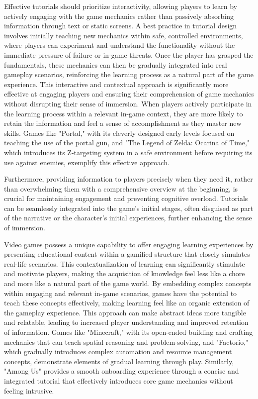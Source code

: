 \documentclass{article}
\begin{document}
    Effective tutorials should prioritize interactivity, allowing players to learn by actively engaging with the game mechanics rather than passively absorbing information through text or static screens. A best practice in tutorial design involves initially teaching new mechanics within safe, controlled environments, where players can experiment and understand the functionality without the immediate pressure of failure or in-game threats. Once the player has grasped the fundamentals, these mechanics can then be gradually integrated into real gameplay scenarios, reinforcing the learning process as a natural part of the game experience. This interactive and contextual approach is significantly more effective at engaging players and ensuring their comprehension of game mechanics without disrupting their sense of immersion. When players actively participate in the learning process within a relevant in-game context, they are more likely to retain the information and feel a sense of accomplishment as they master new skills. Games like "Portal," with its cleverly designed early levels focused on teaching the use of the portal gun, and "The Legend of Zelda: Ocarina of Time," which introduces its Z-targeting system in a safe environment before requiring its use against enemies, exemplify this effective approach.

    Furthermore, providing information to players precisely when they need it, rather than overwhelming them with a comprehensive overview at the beginning, is crucial for maintaining engagement and preventing cognitive overload. Tutorials can be seamlessly integrated into the game's initial stages, often disguised as part of the narrative or the character's initial experiences, further enhancing the sense of immersion.

    Video games possess a unique capability to offer engaging learning experiences by presenting educational content within a gamified structure that closely simulates real-life scenarios. This contextualization of learning can significantly stimulate and motivate players, making the acquisition of knowledge feel less like a chore and more like a natural part of the game world. By embedding complex concepts within engaging and relevant in-game scenarios, games have the potential to teach these concepts effectively, making learning feel like an organic extension of the gameplay experience. This approach can make abstract ideas more tangible and relatable, leading to increased player understanding and improved retention of information. Games like "Minecraft," with its open-ended building and crafting mechanics that can teach spatial reasoning and problem-solving, and "Factorio," which gradually introduces complex automation and resource management concepts, demonstrate elements of gradual learning through play. Similarly, "Among Us" provides a smooth onboarding experience through a concise and integrated tutorial that effectively introduces core game mechanics without feeling intrusive.
\end{document}
